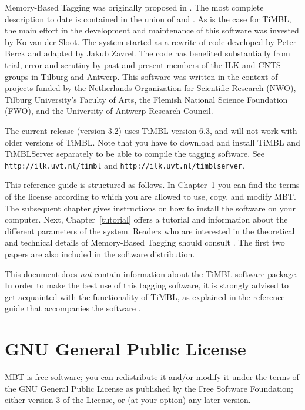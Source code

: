\documentclass{report}
\begin{document}
Memory-Based Tagging was originally proposed in
\cite{Daelemans95}. The most complete description to date is contained
in the union of \cite{Daelemans+96} and \cite{Zavrel+99}.  As is the
case for TiMBL, the main effort in the development and
maintenance of this software was invested by Ko van der Sloot. The
system started as a rewrite of code developed by Peter Berck and
adapted by Jakub Zavrel. The code has benefited substantially from
trial, error and scrutiny by past and present members of the ILK
and CNTS groups in Tilburg and Antwerp. This software was
written in the context of projects funded by the Netherlands
Organization for Scientific Research (NWO), Tilburg University's Faculty
of Arts, the Flemish National Science Foundation (FWO), and the
University of Antwerp Research Council.

The current release (version 3.2) uses TiMBL version 6.3, and will not
work with older versions of TiMBL. Note that you have to download
and install TiMBL and TiMBLServer separately to be able to compile the tagging
software. See {\tt http://ilk.uvt.nl/timbl} and  {\tt http://ilk.uvt.nl/timblserver}.

This reference guide is structured as follows. In
Chapter~\ref{license} you can find the terms of the license according
to which you are allowed to use, copy, and modify MBT. The subsequent
chapter gives instructions on how to install the software on your
computer.  Next, Chapter~\ref{tutorial} offers a tutorial and
information about the different parameters of the system.  Readers who
are interested in the theoretical and technical details of
Memory-Based Tagging should consult
\cite{Daelemans+96,Zavrel+99,Daelemans+05}. The first two papers are
also included in the software distribution.

This document does {\em not}\/ contain information about the TiMBL
software package. In order to make the best use of this tagging
software, it is strongly advised to get acquainted with the
functionality of TiMBL, as explained in the reference guide that
accompanies the software \cite{Daelemans+07}.

\chapter{GNU General Public License}
\label{license}

MBT is free software; you can redistribute it and/or modify it under
the terms of the GNU General Public License as published by the Free
Software Foundation; either version 3 of the License, or (at your
option) any later version.
\end{document}
